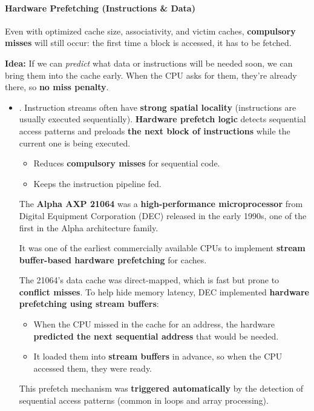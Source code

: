 \paragraph{Hardware Prefetching (Instructions \& Data)}

Even with optimized cache size, associativity, and victim caches, \textbf{compulsory misses} will still occur: the first time a block is accessed, it has to be fetched.

\highspace
\textbf{Idea:} If we can \emph{predict} what data or instructions will be needed soon, we can bring them into the cache early. When the CPU asks for them, they're already there, so \textbf{no miss penalty}.
\begin{itemize}
    \item {}. Instruction streams often have \textbf{strong spatial locality} (instructions are usually executed sequentially). \textbf{Hardware prefetch logic} detects sequential access patterns and preloads \textbf{the next block of instructions} while the current one is being executed.

    \begin{itemize}
        \item[\textcolor{Green3}{\faIcon{check}}] Reduces \textbf{compulsory misses} for sequential code.
        \item[\textcolor{Green3}{\faIcon{check}}] Keeps the instruction pipeline fed.
    \end{itemize}

    \begin{examplebox}
        The \textbf{Alpha AXP 21064} was a \textbf{high-performance microprocessor} from Digital Equipment Corporation (DEC) released in the early 1990s, one of the first in the Alpha architecture family.

        \highspace
        It was one of the earliest commercially available CPUs to implement \textbf{stream buffer-based hardware prefetching} for caches.

        \highspace
        The 21064's data cache was direct-mapped, which is fast but prone to \textbf{conflict misses}. To help hide memory latency, DEC implemented \textbf{hardware prefetching using stream buffers}:
        \begin{itemize}
            \item When the CPU missed in the cache for an address, the hardware \textbf{predicted the next sequential address} that would be needed.
            \item It loaded them into \textbf{stream buffers} in advance, so when the CPU accessed them, they were ready.
        \end{itemize}
        This prefetch mechanism was \textbf{triggered automatically} by the detection of sequential access patterns (common in loops and array processing).


\end{examplebox}
\end{itemize}
